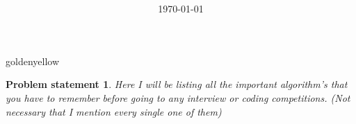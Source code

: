 \documentclass[12pt]{article}
\newtheorem*{prob*}{Problem statement}
\begin{document}
	\title{
		\fontsize{16}{24}\bfseries
	}
	\date{\today}
	\maketitle



	
	\begin{mybox}{goldenyellow}{}
		\begin{prob*}		
			Here I will be listing all the important algorithm's that you have to remember before going to any interview or coding competitions. (Not necessary that I mention every single one of them)
			\end{prob*}
	\end{mybox}


\vspace{0.3cm}				
			
\end{document}
